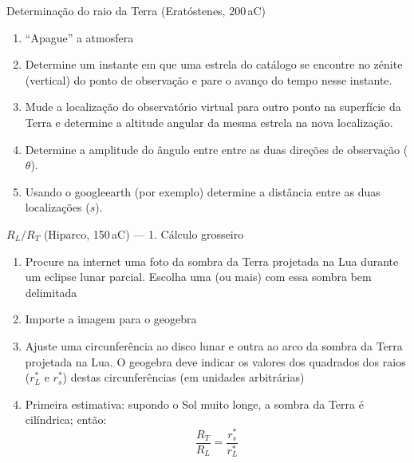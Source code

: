 \documentclass[beamer,9pt,aspectratio=169]{beamer}
\begin{document}
\begin{frame}[label=eratostenes]{Determinação do raio da Terra
  (Eratóstenes, 200\,aC)}
  \begin{minipage}[t]{0.6\linewidth}
    \begin{enumerate}
      \setlength{\itemsep}{1em}
      \item ``Apague'' a atmosfera 
      \item
        Determine um instante em que uma estrela do catálogo se encontre no
        zénite (vertical) do ponto de observação e pare o avanço do tempo nesse
        instante.
      \item
        Mude a localização do observatório virtual para outro ponto na
        superfície da Terra e determine a altitude angular da mesma estrela na
        nova localização. 
      \item
        Determine a amplitude do ângulo entre entre as duas direções de
        observação ($\theta$).
      \item
        Usando o googleearth (por exemplo) determine a distância entre as duas
        localizações ($s$).
    \end{enumerate}

    \vspace{2em}
  \end{minipage}\hfill
\end{frame}
\begin{frame}{$R_L/R_T$ (Hiparco, 150\,aC) --- 1. Cálculo grosseiro}
  \begin{minipage}[t]{0.5\linewidth}
  \begin{enumerate} 
    \item Procure na internet uma foto da sombra da Terra projetada na Lua
      durante um eclipse lunar parcial. Escolha uma (ou mais) com essa sombra
      bem delimitada
    \item
      Importe a imagem para o geogebra
    \item 
      Ajuste uma circunferência ao disco lunar e outra ao arco da sombra da
      Terra projetada na Lua. O geogebra deve indicar os valores dos quadrados
      dos raios ($r^*_L$ e $r^*_s$) destas circunferências (em unidades arbitrárias)
    \item
      Primeira estimativa: supondo o Sol muito longe, a sombra da Terra é
      cilíndrica; então:
      \begin{equation*}
          \frac{R_T}{R_L}=\frac{r^*_s}{r^*_L}
      \end{equation*}
  \end{enumerate}
  \end{minipage}\hfill
\end{frame}
\end{document}
